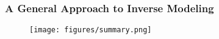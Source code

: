\documentclass[usenames,dvipsnames]{beamer}
\begin{document}
\begin{frame}
	\frametitle{A General Approach to Inverse Modeling}
	\begin{figure}[hbt]
		\texttt{[image: figures/summary.png]}
	\end{figure}
\end{frame}



\end{document}
